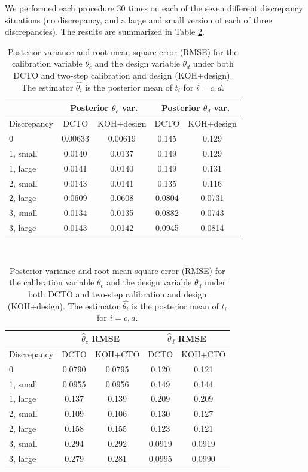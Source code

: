 \documentclass[12pt]{article}
\begin{document}
%
We performed each procedure 30 times on each of the seven different discrepancy situations (no discrepancy, and a large and small version of each of three discrepancies).
%
The results are summarized in Table \ref{table:vars_and_rmses}.
%
\begin{table}[]
	\centering
	\begin{tabular}{l|cc|cc}
		&\multicolumn{2}{c|}{Posterior $\theta_c$ var.}&
		\multicolumn{2}{c}{Posterior $\theta_d$ var.} \\ \hline
		Discrepancy    & DCTO   & KOH+design & DCTO    & KOH+design   \\ \hline
		0              & 0.00633 & 0.00619 & 0.145 & 0.129\\ \hline
		1, small       & 0.0140 & 0.0137 & 0.149 & 0.129\\ \hline
		1, large       & 0.0141 & 0.0140 & 0.149 & 0.131\\ \hline
		2, small       & 0.0143 & 0.0141 & 0.135 & 0.116\\ \hline
		2, large       & 0.0609 & 0.0608 & 0.0804 & 0.0731\\ \hline
		3, small       & 0.0134 & 0.0135 & 0.0882 & 0.0743\\ \hline
		3, large       & 0.0143 & 0.0142 & 0.0945 & 0.0814\\ \hline
	\end{tabular}\\
	\vspace{.25in}
	\begin{tabular}{l|cc|cc}
		&\multicolumn{2}{c|}{$\widehat\theta_c$ RMSE}&
		\multicolumn{2}{c}{$\widehat\theta_d$ RMSE} \\ \hline
		Discrepancy    & DCTO   & KOH+CTO & DCTO    & KOH+CTO   \\ \hline
		0              & 0.0790 & 0.0795 & 0.120 & 0.121\\ \hline
		1, small       & 0.0955 & 0.0956 & 0.149 & 0.144\\ \hline
		1, large       & 0.137 & 0.139 & 0.209 & 0.209\\ \hline
		2, small       & 0.109 & 0.106 & 0.130 & 0.127\\ \hline
		2, large       & 0.158 & 0.155 & 0.123 & 0.121\\ \hline
		3, small       & 0.294 & 0.292 & 0.0919 & 0.0919\\ \hline
		3, large       & 0.279 & 0.281 & 0.0995 & 0.0990\\ \hline
	\end{tabular}
	\caption{Posterior variance and root mean square error (RMSE) for the calibration variable $\theta_c$ and the design variable $\theta_d$ under both DCTO and two-step calibration and design (KOH+design). The estimator $\widehat{\theta_i}$ is the posterior mean of $t_i$ for $i=c,d$.} 
	\label{table:vars_and_rmses}
\end{table}
\end{document}
